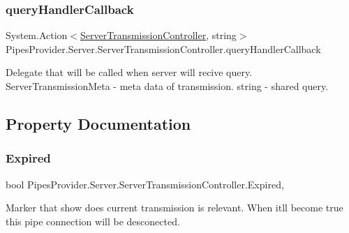 \subsubsection{\texorpdfstring{query\+Handler\+Callback}{queryHandlerCallback}}
{\footnotesize\ttfamily System.\+Action$<$\mbox{\hyperlink{class_pipes_provider_1_1_server_1_1_server_transmission_controller}{Server\+Transmission\+Controller}}, string$>$ Pipes\+Provider.\+Server.\+Server\+Transmission\+Controller.\+query\+Handler\+Callback}



Delegate that will be called when server will recive query. Server\+Transmission\+Meta -\/ meta data of transmission. string -\/ shared query. 



\subsection{Property Documentation}
\mbox{\label{class_pipes_provider_1_1_server_1_1_server_transmission_controller_adafb92b6d6b1cae42003ba0239ef9acb}} 
\subsubsection{\texorpdfstring{Expired}{Expired}}
{\footnotesize\ttfamily bool Pipes\+Provider.\+Server.\+Server\+Transmission\+Controller.\+Expired\hspace{0.3cm}{\ttfamily [get]}, {}}



Marker that show does current transmission is relevant. When it\textquotesingle{}ll become true this pipe connection will be desconected. 

\mbox{\label{class_pipes_provider_1_1_server_1_1_server_transmission_controller_ad8b5ce1e6f928400a384354a0c9502a2}} 
